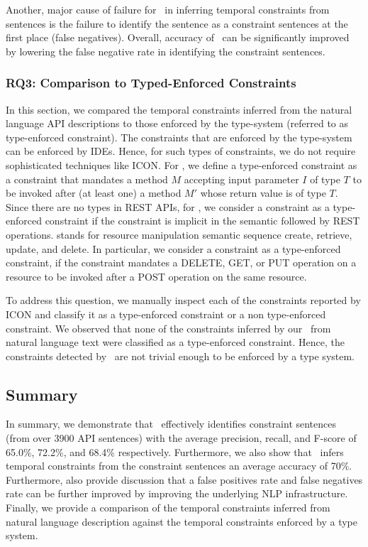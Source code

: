 Another, major cause of failure for \tool\ in inferring temporal constraints from sentences is the failure to identify the sentence as a constraint sentences at the first place (false negatives). Overall, accuracy of \tool\ can be significantly improved by lowering the false negative rate in identifying the constraint sentences. 

\subsubsection{RQ3: Comparison to Typed-Enforced Constraints}

In this section, we compared the temporal constraints inferred from the natural language API descriptions to those enforced by the type-system (referred to as type-enforced constraint).
The constraints that are enforced by the type-system can be enforced by IDEs.
Hence, for such types of constraints, we do not require sophisticated techniques like ICON. 
For , we define a type-enforced constraint as a constraint that mandates a method $M$ accepting input parameter $I$ of type $T$ to be invoked after (at least one) a method $M'$ whose return value is of type $T$. 
Since there are no types in REST APIs, for , we consider a constraint as a type-enforced constraint
if the constraint is implicit in the  semantic followed by REST operations. 
 stands for resource manipulation semantic sequence create, retrieve, update, and delete.
In particular, we consider a constraint as a type-enforced constraint, if the constraint mandates a DELETE, GET, or PUT operation on a resource to be invoked after a POST operation on the same resource. 

To address this question, we manually inspect each of the constraints reported by ICON and classify it as a type-enforced constraint or a non type-enforced constraint. 
We observed that none of the constraints inferred by our \tool\ from natural language text were classified as a type-enforced constraint.
Hence, the constraints detected by \tool\ are not trivial enough to be enforced by a type system.




\subsection{Summary}
\label{sub:summary}

In summary, we demonstrate that \tool\ effectively identifies constraint sentences (from over 3900 API sentences) with the average precision, recall, and F-score of 65.0\%, 72.2\%, and 68.4\% respectively. Furthermore, we also show that \tool\ infers temporal constraints from the constraint sentences an average accuracy of 70\%. Furthermore, also provide discussion that a false positives rate and false negatives rate can be further improved by improving the underlying NLP infrastructure. Finally, we provide a comparison of the temporal constraints inferred from natural language description against the temporal constraints enforced by a type system. 


